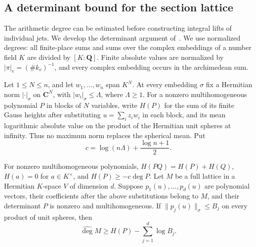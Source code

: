 \subsection{A determinant bound for the section lattice}
\label{sec:arithmetic-determinant-degree}

The arithmetic degree can be estimated before constructing integral
lifts of individual jets.  We develop the determinant argument
of~\cite{arithmetic-determinant-source}.  We use normalized degrees: all finite-place
sums and sums over the complex embeddings of a number field $K$ are
divided by $[K:\mathbf Q]$.  Finite absolute values are normalized by
$|\pi|_v=(\#k_v)^{-1}$, and every complex embedding occurs in the
archimedean sum.

Let $1\leq N\leq n$, and let $w_1,\ldots,w_n$ span $K^N$.
At every embedding $\sigma$ fix a
Hermitian norm $|\cdot|_\sigma$ on $\mathbf C^N$, with
$|w_i|_\sigma\leq\Lambda$, where $\Lambda\geq1$.  For a nonzero
multihomogeneous polynomial $P$ in blocks of $N$ variables, write
$H(P)$ for the sum of its finite Gauss heights after substituting
$u=\sum_i z_iw_i$ in each block, and its mean logarithmic absolute
value on the product of the Hermitian unit spheres at infinity.
Thus no maximum norm replaces the spherical mean.  Put
\[
 c=\log(n\Lambda)+\frac{\log n+1}{2}.
\]

\begin{lemma}\label{lem:arithmetic-polynomial-determinant}
For nonzero multihomogeneous polynomials,
$H(PQ)=H(P)+H(Q)$, $H(a)=0$ for $a\in K^\times$, and
$H(P)\geq-c\deg P$.  Let $M$ be a full lattice in a Hermitian
$K$-space $V$ of dimension $d$.  Suppose $p_1(u),\ldots,p_d(u)$ are
polynomial vectors, their coefficients after the above substitutions
belong to $M$, and their determinant $P$ is nonzero and
multihomogeneous.  If $\|p_j(u)\|_\sigma\leq B_j$ on every product
of unit spheres, then
\begin{equation}\label{eq:arithmetic-polynomial-determinant}
             \widehat{\deg}M\geq H(P)-\sum_{j=1}^d\log B_j.
\end{equation}
\end{lemma}

